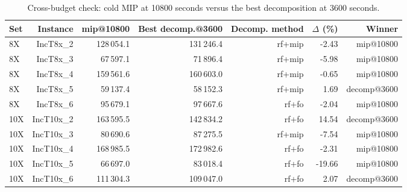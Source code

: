 \begin{table}[t]
\centering
\footnotesize
\caption{Cross-budget check: cold MIP at 10800 seconds versus the best decomposition at 3600 seconds.}
\label{tab:q5}
\begin{tabular}{lrrrrrr}
\toprule
Set & Instance & mip@10800 & Best decomp.@3600 & Decomp. method & $\Delta$ (\%) & Winner \\
\midrule
8X & IncT8x\_2 & 128\,054.1 & 131\,246.4 & rf+mip & -2.43 & mip@10800 \\
8X & IncT8x\_3 & 67\,597.1 & 71\,896.4 & rf+mip & -5.98 & mip@10800 \\
8X & IncT8x\_4 & 159\,561.6 & 160\,603.0 & rf+mip & -0.65 & mip@10800 \\
8X & IncT8x\_5 & 59\,137.4 & 58\,152.3 & rf+mip & 1.69 & decomp@3600 \\
8X & IncT8x\_6 & 95\,679.1 & 97\,667.6 & rf+fo & -2.04 & mip@10800 \\
10X & IncT10x\_2 & 163\,595.5 & 142\,834.2 & rf+fo & 14.54 & decomp@3600 \\
10X & IncT10x\_3 & 80\,690.6 & 87\,275.5 & rf+mip & -7.54 & mip@10800 \\
10X & IncT10x\_4 & 168\,985.5 & 172\,982.6 & rf+fo & -2.31 & mip@10800 \\
10X & IncT10x\_5 & 66\,697.0 & 83\,018.4 & rf+fo & -19.66 & mip@10800 \\
10X & IncT10x\_6 & 111\,304.3 & 109\,047.0 & rf+fo & 2.07 & decomp@3600 \\
\bottomrule
\end{tabular}
\end{table}
